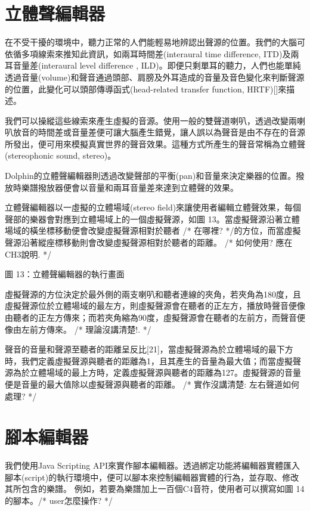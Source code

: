 \documentclass[12pt,a4paper,oneside]{report}
\begin{document}
\section{立體聲編輯器}

在不受干擾的環境中，聽力正常的人們能輕易地辨認出聲源的位置。我們的大腦可依循多項線索來推知此資訊，如兩耳時間差(interaural time difference, ITD)及兩耳音量差(interaural level difference , ILD)。即便只剩單耳的聽力，人們也能單純透過音量(volume)和聲音通過頭部、肩膀及外耳造成的音量及音色變化來判斷聲源的位置，此變化可以頭部傳導函式(head-related transfer function, HRTF)[]來描述。

我們可以操縱這些線索來產生虛擬的音源。使用一般的雙聲道喇叭，透過改變兩喇叭放音的時間差或音量差便可讓大腦產生錯覺，讓人誤以為聲音是由不存在的音源所發出，便可用來模擬真實世界的聲音效果。這種方式所產生的聲音常稱為立體聲(stereophonic sound, stereo)。

Dolphin的立體聲編輯器則透過改變聲部的平衡(pan)和音量來決定樂器的位置。撥放時樂譜撥放器便會以音量和兩耳音量差來達到立體聲的效果。

立體聲編輯器以一虛擬的立體場域(stereo field)來讓使用者編輯立體聲效果，每個聲部的樂器會對應到立體場域上的一個虛擬聲源，如圖 13。當虛擬聲源沿著立體場域的橫坐標移動便會改變虛擬聲源相對於聽者 /* 在哪裡?  */的方位，而當虛擬聲源沿著縱座標移動則會改變虛擬聲源相對於聽者的距離。  /* 如何使用? 應在CH3說明. */


圖 13：立體聲編輯器的執行畫面

虛擬聲源的方位決定於最外側的兩支喇叭和聽者連線的夾角，若夾角為180度，且虛擬聲源位於立體場域的最左方，則虛擬聲源會在聽者的正左方，播放時聲音便像由聽者的正左方傳來；而若夾角縮為90度，虛擬聲源會在聽者的左前方，而聲音便像由左前方傳來。  /*
理論沒講清楚!.
*/

聲音的音量和聲源至聽者的距離呈反比[21]，當虛擬聲源為於立體場域的最下方時，我們定義虛擬聲源與聽者的距離為1，且其產生的音量為最大值；而當虛擬聲源為於立體場域的最上方時，定義虛擬聲源與聽者的距離為127。虛擬聲源的音量便是音量的最大值除以虛擬聲源與聽者的距離。 /*
實作沒講清楚: 左右聲道如何處理?
*/

\section{腳本編輯器}

我們使用Java Scripting API來實作腳本編輯器。透過綁定功能將編輯器實體匯入腳本(script)的執行環境中，便可以腳本來控制編輯器實體的行為，並存取、修改其所包含的樂譜。
例如，若要為樂譜加上一百個C4音符，使用者可以撰寫如圖 14的腳本。/* user怎麼操作? */
\end{document}
